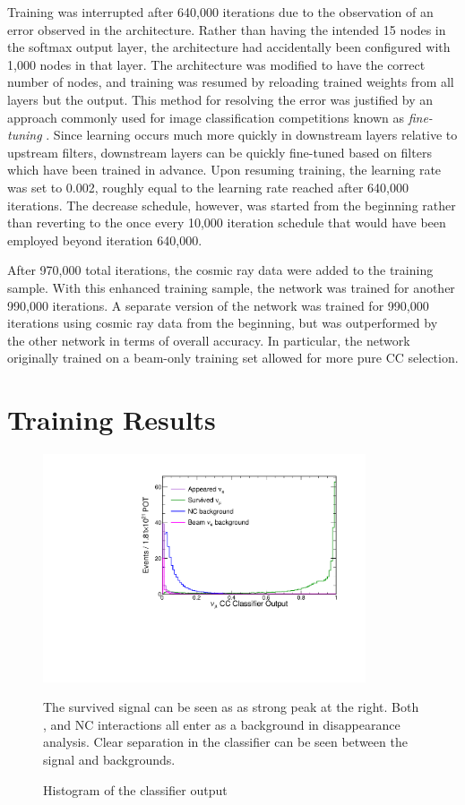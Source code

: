 Training was interrupted after 640,000 iterations due to the observation
of an error observed in the architecture.
Rather than having the intended 15 nodes in the softmax output layer,
the architecture had accidentally been configured with 1,000 nodes in that
layer.
The architecture was modified to have the correct number of nodes, and training
was resumed by reloading trained weights from all layers but the output.
This method for resolving the error was justified by an approach
commonly used for image classification competitions known as
\textit{fine-tuning} \cite{krizhevsky2012imagenet}.
Since learning occurs much more quickly in downstream layers relative to
upstream filters, downstream layers can be quickly fine-tuned based on
filters which have been trained in advance.
Upon resuming training, the learning rate was set to 0.002, roughly equal to
the learning rate reached after 640,000 iterations.
The decrease schedule, however, was started from the beginning rather
than reverting to the once every 10,000 iteration schedule
that would have been employed beyond iteration 640,000.

After 970,000 total iterations, the cosmic ray data were added to the
training sample.
With this enhanced training sample, the network was trained for another
990,000 iterations.
A separate version of the network was trained for 990,000 iterations
using cosmic ray data from the beginning, but was outperformed by the
other network in terms of overall accuracy.
In particular, the network originally trained on a beam-only training set
allowed for more pure \nue CC selection.


\section{Training Results}

\begin{figure}[t]
\begin{center}
\includegraphics[width=0.85\textwidth]{figures/cnn/numu_pid_dist.pdf}
\end{center}
\caption{Histogram of the \nue classifier output}{
The survived \numu signal can be seen as as strong peak at the right.
Both \nue, and NC interactions all enter as a background
in \numu disappearance analysis.
Clear separation in the classifier can be seen between the signal and backgrounds.
}
\label{numupid}
\end{figure}


